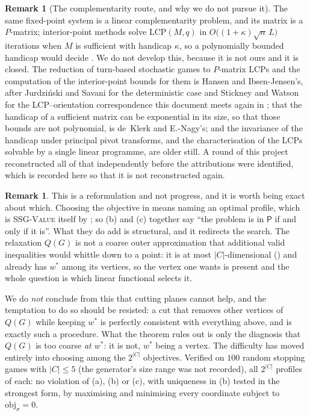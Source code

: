 \documentclass[11pt]{article}
\theoremstyle{plain}
\theoremstyle{definition}
\newtheorem{remark}[theorem]{Remark}
\begin{document}
\begin{remark}[The complementarity route, and why we do not pursue it]\label{rem:lcp}
The same fixed-point system is a linear complementarity problem, and its
matrix is a $P$-matrix; interior-point methods solve $\mathrm{LCP}(M,q)$ in
$O\bigl((1+\kappa)\sqrt n\,L\bigr)$ iterations when $M$ is sufficient with
handicap $\kappa$, so a polynomially bounded handicap would decide
. We do not develop this, because it is not ours and it is
closed. The reduction of turn-based stochastic games to $P$-matrix LCPs and
the computation of the interior-point bounds for them is Hansen and
Ibsen-Jensen's, after Jurdzi\'nski and Savani for the deterministic case and
Stickney and Watson for the LCP--orientation correspondence this document
meets again in ; that the handicap of a sufficient
matrix can be exponential in its size, so that those bounds are not
polynomial, is de~Klerk and E.-Nagy's; and the invariance of the handicap
under principal pivot transforms, and the characterisation of the LCPs
solvable by a single linear programme, are older still. A round of this
project reconstructed all of that independently before the attributions were
identified, which is recorded here so that it is not reconstructed again.
\end{remark}

\begin{remark}\label{rem:transport-objective}
This is a reformulation and not progress, and it is worth being exact about
which. Choosing the objective in  means naming an
optimal profile, which is \textsc{SSG-Value} itself by
; so (b) and (c) together say ``the problem is in
$\mathsf P$ if and only if it is''. What they do add is structural, and it
redirects the search. The relaxation $Q(G)$ is not a coarse outer
approximation that additional valid inequalities would whittle down to a point:
it is at most $|C|$-dimensional () and already has
$w^\ast$ among its vertices, so the vertex one wants is present and the whole
question is which linear functional selects it.

We do \emph{not} conclude from this that cutting planes cannot help, and the
temptation to do so should be resisted: a cut that removes other vertices of
$Q(G)$ while keeping $w^\ast$ is perfectly consistent with everything above,
and  is exactly such a procedure. What the theorem rules out
is only the diagnosis that $Q(G)$ is too coarse \emph{at $w^\ast$}: it is not,
$w^\ast$ being a vertex. The difficulty has moved entirely into choosing among
the $2^{|C|}$ objectives.
Verified on $100$ random stopping games with $|C|\le5$ (the generator's
size range was not recorded), all $2^{|C|}$ profiles of each:
no violation of (a), (b) or (c), with uniqueness in (b) tested in the strongest
form, by maximising and minimising every coordinate subject to
$\mathrm{obj}_\sigma=0$.
\end{remark}
\end{document}
